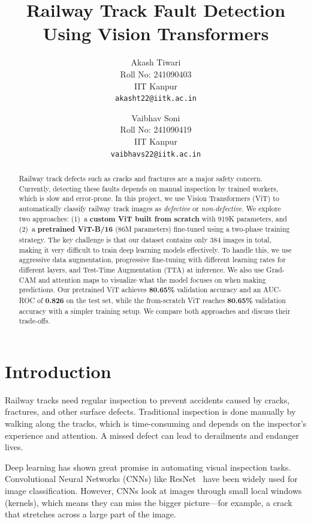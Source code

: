 \documentclass[10pt,twocolumn,letterpaper]{article}
\title{Railway Track Fault Detection Using Vision Transformers}
\author{
Akash Tiwari\\
Roll No: 241090403\\
IIT Kanpur\\
{\tt\small akasht22@iitk.ac.in}
\and
Vaibhav Soni\\
Roll No: 241090419\\
IIT Kanpur\\
{\tt\small vaibhavs22@iitk.ac.in}
}
\begin{document}
\maketitle

\begin{abstract}
Railway track defects such as cracks and fractures are a major safety concern. Currently, detecting these faults depends on manual inspection by trained workers, which is slow and error-prone. In this project, we use Vision Transformers (ViT) to automatically classify railway track images as \textit{defective} or \textit{non-defective}. We explore two approaches: (1)~a \textbf{custom ViT built from scratch} with 919K parameters, and (2)~a \textbf{pretrained ViT-B/16} (86M parameters) fine-tuned using a two-phase training strategy. The key challenge is that our dataset contains only 384 images in total, making it very difficult to train deep learning models effectively. To handle this, we use aggressive data augmentation, progressive fine-tuning with different learning rates for different layers, and Test-Time Augmentation (TTA) at inference. We also use Grad-CAM and attention maps to visualize what the model focuses on when making predictions. Our pretrained ViT achieves \textbf{80.65\%} validation accuracy and an AUC-ROC of \textbf{0.826} on the test set, while the from-scratch ViT reaches \textbf{80.65\%} validation accuracy with a simpler training setup. We compare both approaches and discuss their trade-offs.
\end{abstract}

\section{Introduction}

Railway tracks need regular inspection to prevent accidents caused by cracks, fractures, and other surface defects. Traditional inspection is done manually by walking along the tracks, which is time-consuming and depends on the inspector's experience and attention. A missed defect can lead to derailments and endanger lives.

Deep learning has shown great promise in automating visual inspection tasks. Convolutional Neural Networks (CNNs) like ResNet~\cite{He2016} have been widely used for image classification. However, CNNs look at images through small local windows (kernels), which means they can miss the bigger picture---for example, a crack that stretches across a large part of the image.
\end{document}
